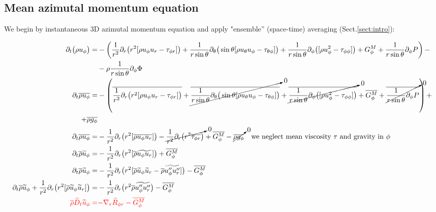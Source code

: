 \documentclass[10pt,paper=a4]{report}
\newcommand{\eht}{\overline}
\newcommand{\fht}{\widetilde}
\begin{document}
\fontsize{12pt}{20pt}

\subsection{Mean azimutal momentum equation}

We begin by instantaneous 3D azimutal momentum equation and apply "ensemble'' (space-time) averaging (Sect.\ref{sect:intro}):

\fontsize{9pt}{20pt}

\begin{align}
\partial_{t} \big(\rho u_{\phi}\big) = & -\left( \frac{1}{r^{2}} \partial_{r} \big(r^{2} [\rho u_{\phi} u_r - \tau_{\phi r}]\big) + \frac{1}{r\sin{\theta}}\partial_{\theta}\big(\sin{\theta}[\rho u_{\theta}u_\phi - \tau_{\theta \phi}]\big) + \frac{1}{r\sin{\theta}}\partial_{\phi}\big([\rho u_{\phi}^2 - \tau_{\phi \phi}]\big) + G_\phi^M + \frac{1}{r\sin{\theta}} \partial_{\phi} P \right) - \\
& - \rho \frac{1}{r \sin{\theta}} \partial_{\phi} \Phi \nonumber \\
\partial_{t} \eht{\rho u_{\phi}} = & -\left( \eht{\frac{1}{r^{2}} \partial_{r} \big(r^{2} [\rho u_{\phi} u_r - \tau_{\phi r}]\big)} + \cancelto{0}{\eht{\frac{1}{r\sin{\theta}}\partial_{\theta}\big(\sin{\theta}[\rho u_{\theta}u_\phi - \tau_{\theta \phi}]\big)}} + \cancelto{0}{\eht{\frac{1}{r\sin{\theta}}\partial_{\phi}\big([\rho u_{\phi}^2 - \tau_{\phi \phi}]\big)}} + \eht{G_\phi^M} + \cancelto{0}{\eht{\frac{1}{r\sin{\theta}} \partial_{\phi} P}} \right) + \nonumber \\ 
+ \eht{\rho g_\phi} \\
\partial_{t} \eht{\rho u_{\phi}} = & -\frac{1}{r^{2}} \partial_{r} \big(r^{2} [\eht{\rho u_{\phi} u_r}] \big) - \cancelto{0}{\frac{1}{r^{2}} \partial_{r} \big(r^{2} \eht{\tau_{\phi r}} \big)} + \eht{G_\phi^M} - \cancelto{0}{\eht{\rho g_\phi}} \ \ \ \mbox{we neglect mean viscosity $\tau$ and gravity in $\phi$} \\
\partial_{t} \eht{\rho} \fht{u}_{\phi} = & -\frac{1}{r^{2}} \partial_{r} \big(r^{2} [\eht{\rho} \fht{u_{\phi} u_r}] \big) + \eht{G_\phi^M} \\
\partial_{t} \eht{\rho} \fht{u}_{\phi} = & -\frac{1}{r^{2}} \partial_{r} \big(r^{2} [\eht{\rho} \fht{u}_{\phi} \fht{u}_r - \eht{\rho} \fht{u''_\phi u''_r}] \big) - \eht{G_\phi^M} \\
\partial_{t} \eht{\rho} \fht{u}_{\phi} + \frac{1}{r^{2}} \partial_{r} \big(r^{2} [\eht{\rho} \fht{u}_{\phi} \fht{u}_r]\big) = & -\frac{1}{r^{2}} \partial_{r} \big(r^{2} \eht{\rho} \fht{u''_\phi u''_r} \big) - \eht{G_\phi^M} \\
{\color{red} \eht{\rho}\fht{D}_t \fht{u}_\phi =} & {\color{red} -\nabla_r \fht{R}_{\phi r} - \eht{G_\phi^M}}
\end{align}
\end{document}
